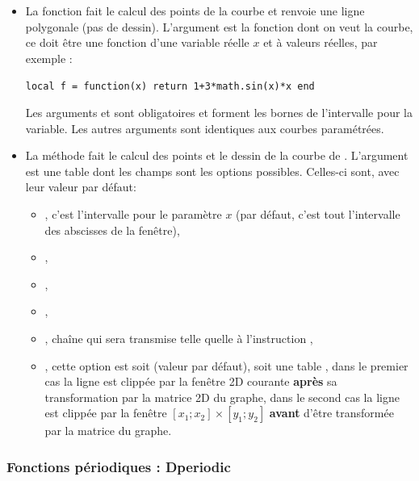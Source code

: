 \begin{itemize}
\item La fonction  fait le calcul des points de la courbe et renvoie une ligne polygonale (pas de dessin). L'argument  est la fonction dont on veut la courbe, ce doit être une fonction d'une variable réelle $x$ et à valeurs réelles, par exemple :

    \texttt{local f = function(x) return 1+3*math.sin(x)*x end}

    Les arguments  et  sont obligatoires et forment les bornes de l'intervalle pour la variable. Les autres arguments sont identiques aux courbes paramétrées.

\item La méthode  fait le calcul des points et le dessin de la courbe de . L'argument  est une table dont les champs sont les options possibles. Celles-ci sont, avec leur valeur par défaut:

  \begin{itemize}
      \item {}, c'est l'intervalle pour le paramètre $x$ (par défaut, c'est tout l'intervalle des abscisses de la fenêtre), 
      \item {}, 
      \item {},
      \item {},
      \item {},  chaîne qui sera transmise telle quelle à l'instruction \drawcmd,
      \item {}, cette option est soit \nil (valeur par défaut), soit une table , dans le premier cas la ligne est clippée par la fenêtre 2D courante \textbf{après} sa transformation par la matrice 2D du graphe, dans le second cas la ligne est clippée par la fenêtre $[x_1;x_2]\times[y_1;y_2]$ \textbf{avant} d'être transformée par la matrice du graphe.
  \end{itemize}
\end{itemize}

\subsubsection{Fonctions périodiques : Dperiodic}


